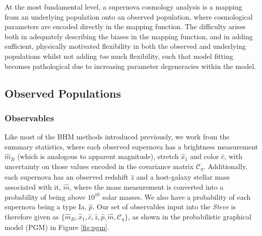 \documentclass[twocolumn,trackchanges,tighten]{aastex62}
\newcommand{\cov}{\mathcal{C}_\eta}
\newcommand{\steve}{\textit{Steve}}
\begin{document}
At the most fundamental level, a supernova cosmology analysis is a mapping from an underlying population onto an observed population, where cosmological parameters are encoded directly in the mapping function. The difficulty arises both in adequately describing the biases in the mapping function, and in adding sufficient, physically motivated flexibility in both the observed and underlying populations whilst not adding \textit{too} much flexibility, such that model fitting becomes pathological due to increasing parameter degeneracies within the model.



\subsection{Observed Populations}

\subsubsection{Observables}
Like most of the BHM methods introduced previously, we work from the summary statistics, where each observed supernova has a brightness measurement $\hat{m}_B$ (which is analogous to apparent magnitude), stretch $\hat{x}_1$ and color $\hat{c}$, with uncertainty on those values encoded in the covariance matrix $\cov$. Additionally, each supernova has an observed redshift $\hat{z}$ and a host-galaxy stellar mass associated with it, $\hat{m}$, where the mass measurement is converted into a probability of being above $10^{10}$ solar masses. We also have a probability of each supernova being a type Ia, $\hat{p}$. Our set of observables input into the {\steve} is therefore given as $\lbrace \hat{m}_B, \hat{x}_1, \hat{c}, \hat{z}, \hat{p}, \hat{m}, \cov \rbrace$, as shown in the probabilistic graphical model (PGM) in Figure \ref{fig:pgm}.
\end{document}
